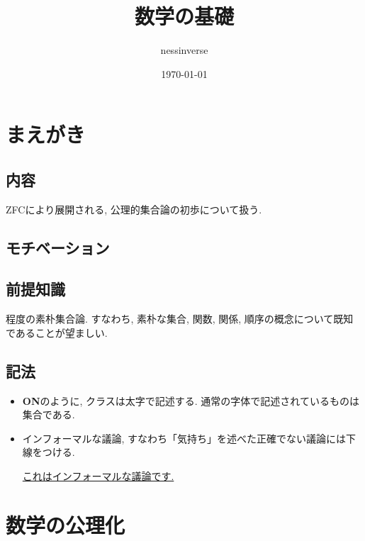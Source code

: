 \documentclass[a4paper]{bxjsarticle}
\title{数学の基礎}
\author{nessinverse}
\date{\today}
\theoremstyle{definition}
\begin{document}
    \maketitle
    
    \section*{まえがき}
    \subsection*{内容}
    ZFCにより展開される, 公理的集合論の初歩について扱う. 
    \subsection*{モチベーション}
    
    \subsection*{前提知識}
    \cite{matsuzaka}程度の素朴集合論. すなわち, 素朴な集合, 関数, 関係, 順序の概念について既知であることが望ましい.
    \subsection*{記法}
    \begin{itemize}
        \item \textbf{ON}のように, クラスは太字で記述する. 通常の字体で記述されているものは集合である.
        \item インフォーマルな議論, すなわち「気持ち」を述べた正確でない議論には下線をつける.
        
        \underline{これはインフォーマルな議論です.}
    \end{itemize}
    \newpage
    \tableofcontents
    \newpage    
    
    \section{数学の公理化}
    
\end{document}
